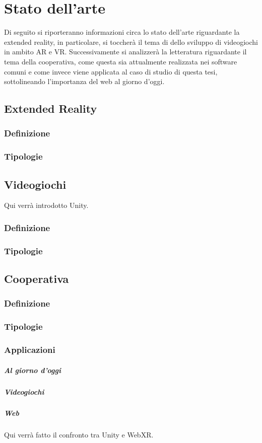 \chapter{Stato dell'arte}\label{chap:Letteratura}
Di seguito si riporteranno informazioni circa lo stato dell'arte riguardante la extended reality, 
in particolare, si toccherà il tema di dello sviluppo di videogiochi in ambito AR e VR. Successivamente
si analizzerà la letteratura riguardante il tema della cooperativa, come questa sia attualmente 
realizzata nei software comuni e come invece viene applicata al caso di studio di questa tesi, 
sottolineando l'importanza del web al giorno d'oggi.

\section{Extended Reality}\label{sec:XR}
    \subsection{Definizione}\label{subsec:XRDef}
    \subsection{Tipologie}\label{subsec:XRTipologie}

\section{Videogiochi}\label{sec:Videogiochi}
Qui verrà introdotto Unity.
    \subsection{Definizione}\label{subsec:VideogiochiDef}
    \subsection{Tipologie}\label{subsec:VideogiochiTipologie}

\section{Cooperativa}\label{sec:Coop}
    \subsection{Definizione}\label{subsec:CoopDef}
    \subsection{Tipologie}\label{subsec:CoopTipologie}
    \subsection{Applicazioni}\label{subsec:CoopApplicazioni}
        \paragraph{Al giorno d'oggi}\label{par:CoopOggi}
        \paragraph{Videogiochi}\label{par:CoopVideogiochi}
        \paragraph{Web}\label{par:CoopWeb}
        Qui verrà fatto il confronto tra Unity e WebXR.
